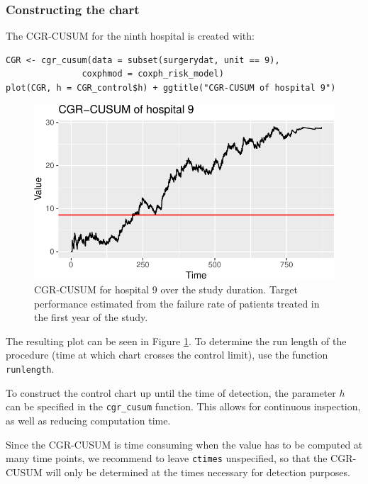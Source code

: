\hypertarget{constructing-the-chart-1}{%
\subsubsection{Constructing the chart}\label{constructing-the-chart-1}}

The CGR-CUSUM for the ninth hospital is created with:

\begin{verbatim}
CGR <- cgr_cusum(data = subset(surgerydat, unit == 9), 
               coxphmod = coxph_risk_model)
plot(CGR, h = CGR_control$h) + ggtitle("CGR-CUSUM of hospital 9")
\end{verbatim}

\begin{figure}
\centering
\includegraphics{RJ-2023-095_files/figure-latex/cgrcusumfig-1.pdf}
\caption{\label{fig:cgrcusumfig}CGR-CUSUM for hospital 9 over the study duration. Target performance estimated from the failure rate of patients treated in the first year of the study.}
\end{figure}

The resulting plot can be seen in Figure \ref{fig:cgrcusumfig}. To determine the run length of the procedure (time at which chart crosses the control limit), use the function \texttt{runlength}.

To construct the control chart up until the time of detection, the parameter \(h\) can be specified in the \texttt{cgr\_cusum} function. This allows for continuous inspection, as well as reducing computation time.

Since the CGR-CUSUM is time consuming when the value has to be computed at many time points, we recommend to leave \texttt{ctimes} unspecified, so that the CGR-CUSUM will only be determined at the times necessary for detection purposes.

